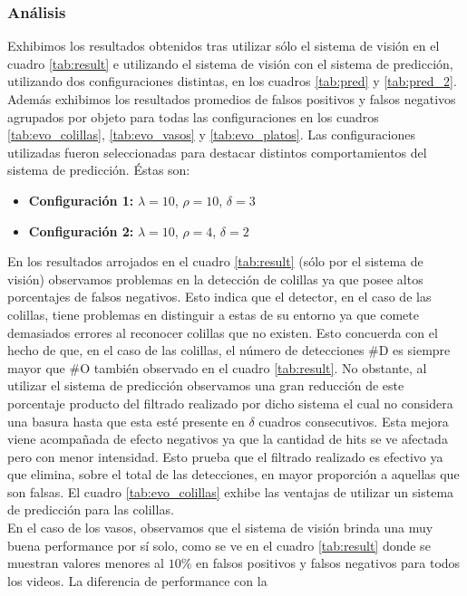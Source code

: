 \subsubsection{Análisis}
Exhibimos los resultados obtenidos tras utilizar sólo el sistema de 
visión en el cuadro \ref{tab:result} e utilizando el sistema de 
visión con el sistema de predicción, utilizando dos configuraciones 
distintas, en 
los cuadros \ref{tab:pred} y  \ref{tab:pred_2}. Además exhibimos los 
resultados promedios de falsos positivos y falsos negativos agrupados 
por objeto para todas las configuraciones en los cuadros \ref{tab:evo_colillas}, 
\ref{tab:evo_vasos} y \ref{tab:evo_platos}. Las configuraciones 
utilizadas fueron seleccionadas para destacar distintos comportamientos del 
sistema de predicción. Éstas son:
\begin{itemize}
\item{\textbf{Configuración 1:} $\lambda=10$, $\rho=10$, $\delta=3$}
	\item{\textbf{Configuración 2:} $\lambda=10$, $\rho=4$, $\delta=2$}
\end{itemize}
\indent En los resultados arrojados en el cuadro \ref{tab:result} 
(sólo por el sistema de visión) observamos problemas en la  detección de colillas ya que posee altos 
porcentajes de falsos negativos. Esto indica que el detector, en el 
caso de las colillas, tiene
problemas en distinguir a estas de su entorno ya que comete 
demasiados errores al reconocer colillas que no existen. Esto concuerda 
con el hecho de que, en el caso de las colillas, el número de 
detecciones \#D es siempre mayor que \#O también observado en el 
cuadro \ref{tab:result}. No obstante, al utilizar el sistema de 
predicción observamos una gran reducción de este porcentaje producto 
del filtrado realizado por dicho sistema el cual no considera una 
basura hasta que esta esté presente en $\delta$ cuadros consecutivos.  
Esta mejora viene acompañada de efecto negativos ya que la cantidad de 
hits se ve afectada pero con menor intensidad. Esto prueba que el 
filtrado realizado es efectivo ya que elimina, sobre el total de las 
detecciones, en mayor proporción a 
aquellas que son falsas. El cuadro \ref{tab:evo_colillas} exhibe las ventajas de utilizar un sistema de 
predicción para las colillas.\\
\indent 
En el caso de los vasos, observamos que el sistema de visión brinda 
una muy buena performance por sí solo, como se ve en el cuadro \ref{tab:result} 
donde se muestran valores menores al $10\%$ en falsos positivos y falsos 
negativos para todos los videos. La diferencia de performance con la 
